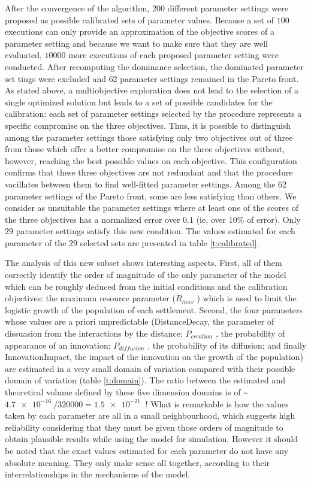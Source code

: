 After the convergence of the algorithm, $200$ different parameter settings were proposed as possible calibrated sets of parameter values. Because a set of $100$ executions can only provide an approximation of the objective scores of a parameter setting and because we want to make sure that they are well evaluated, $\num{10000}$ more executions of each proposed parameter setting were conducted. After recomputing the dominance selection, the dominated parameter set­ tings were excluded and $62$ parameter settings remained in the Pareto front. As stated above, a multiobjective exploration does not lead to the selection of a single optimized solution but leads to a set of possible candidates for the calibration: each set of parameter settings selected by the procedure represents a specific compromise on the three objectives. Thus, it is possible to distinguish among the parameter settings those satisfying only two objectives out of three from those which offer a better compromise on the three objectives without, however, reaching the best possible values on each objective. This configuration confirms that these three objectives are not redundant and that the procedure vacillates between them to find well-fitted parameter settings. Among the $62$ parameter settings of the Pareto front, some are less satisfying than others. We consider as unsuitable the parameter settings where at least one of the scores of the three objectives has a normalized error over $0.1$ (ie, over $10\%$ of error). Only $29$ parameter settings satisfy this new condition. The values estimated for each parameter of the $29$ selected sets are presented in table \ref{t:calibrated}.


The analysis of this new subset shows interesting aspects. First, all of them correctly identify the order of magnitude of the only parameter of the model which can be roughly deduced from the initial conditions and the calibration objectives: the maximum resource parameter ($R_{max}$ ) which is used to limit the logistic growth of the population of each settlement. Second, the four parameters whose values are a priori unpredictable (DistanceDecay, the parameter of dissuasion from the interactions by the distance; $P_{creation}$ , the probability of appearance of an innovation; $P_{diffusion}$ , the probability of its diffusion; and finally InnovationImpact, the impact of the innovation on the growth of the population) are estimated in a very small domain of variation compared with their possible domain of variation (table \ref{t:domain}). The ratio between the estimated and theoretical volume defined by these five dimension domains is of \~ $\SI{4.7e-16}{} / \num{320000}{} = \SI{1.5e-21}{}$ ! What is remarkable is how the values taken by each parameter are all in a small neighbourhood, which suggests high reliability considering that they must be given those orders of magnitude to obtain plausible results while using the model for simulation. However it should be noted that the exact values estimated for each parameter do not have any absolute meaning. They only make sense all together, according to their interrelationships in the mechanisms of the model.

